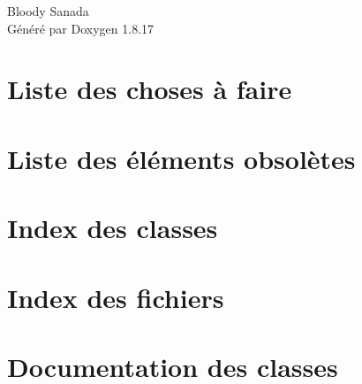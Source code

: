 \let\mypdfximage\pdfximage\def\pdfximage{\immediate\mypdfximage}\documentclass[twoside]{book}
\newcommand{\+}{\discretionary{\mbox{\scriptsize$\hookleftarrow$}}{}{}}
\newcommand{\clearemptydoublepage}{%
  \newpage{\pagestyle{empty}\cleardoublepage}%
}
\begin{document}
\hypersetup{pageanchor=false,
             bookmarksnumbered=true,
             pdfencoding=unicode
            }
\begin{titlepage}
\vspace*{7cm}
\begin{center}%
{\Large Bloody Sanada }\\
\vspace*{1cm}
{\large Généré par Doxygen 1.8.17}\\
\end{center}
\end{titlepage}
\clearemptydoublepage
{}
\tableofcontents
\clearemptydoublepage
{}
\hypersetup{pageanchor=true}

\chapter{Liste des choses à faire}
\label{todo}

\chapter{Liste des éléments obsolètes}
\label{deprecated}

\chapter{Index des classes}

\chapter{Index des fichiers}

\chapter{Documentation des classes}





















\end{document}
